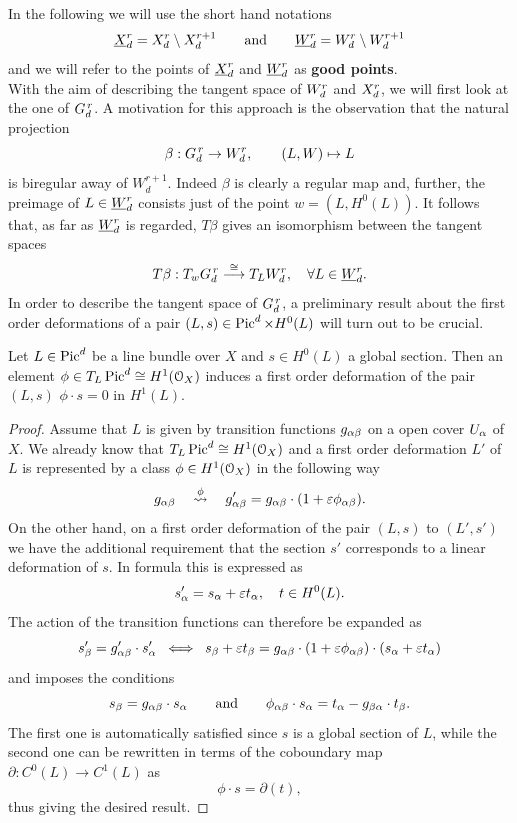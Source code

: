 	In the following we will use the short hand notations
	$$ \underline{X}_d^{r} = X_d^r\setminus X_d^{r+1} \qquad \text{and} \qquad \underline{W}_d^{r} = W_d^r\setminus W_d^{r+1} $$
	and we will refer to the points of $\underline{X}_d^{r}$ and $\underline{W}_d^{r}$ as \textbf{good points}.\\
	With the aim of describing the tangent space of $W_d^r$ and $X_d^r$, we will first look at the one of $G_d^{\,r}$. A motivation for this approach is the observation that the natural projection
	$$ \beta:G_d^{\,r}\to W_d^r, \qquad (L,W) \mapsto L $$
	is biregular away of $W_d^{r+1}$. Indeed $\beta$ is clearly a regular map and, further, the preimage of $L\in \underline{W}_d^{r}$ consists just of the point $w=(L,H^0(L))$. It follows that, as far as $\underline{W}_d^{r}$ is regarded, $T\beta$ gives an isomorphism between the tangent spaces
	\begin{equation}\label{eq:tgnt_Wdrr}
		T\beta : T_{w}G_d^{\,r} \overset{\cong}\longrightarrow T_LW_d^r, \quad \forall L\in\underline{W}_d^{r}.
	\end{equation}
	In order to describe the tangent space of $G_d^{\,r}$, a preliminary result about the first order deformations of a pair $(L,s) \in \operatorname{Pic}^d \times H^0(L)$ will turn out to be crucial.
	\begin{prop}\label{prop:cohom_condition}
		Let $L\in \operatorname{Pic}^d$ be a line bundle over $X$ and $s\in H^0(L)$ a global section. Then an element $\phi \in T_L\operatorname{Pic}^d \cong H^1(\mathcal{O}_X)$ induces a first order deformation of the pair $(L,s)$ \ABiff $\phi\cdot s=0$ in $H^1(L)$.
	\end{prop}
	\begin{proof}
		Assume that $L$ is given by transition functions $g_{\alpha\beta}$ on a open cover $U_\alpha$ of $X$. We already know that $T_L \operatorname{Pic}^d \cong H^1(\mathcal{O}_X)$ and a first order deformation $L'$ of $L$ is represented by a class $\phi \in H^1(\mathcal{O}_X)$ in the following way
		$$ g_{\alpha\beta} \quad\overset{\phi}\leadsto\quad g'_{\alpha\beta} = g_{\alpha\beta} \cdot (1+ \varepsilon \phi_{\alpha\beta}). $$  
		On the other hand, on a first order deformation of the pair $(L,s)$ to $(L',s')$ we have the additional requirement that the section $s'$ corresponds to a linear deformation of $s$. In formula this is expressed as
		$$ s'_\alpha = s_\alpha + \varepsilon t_\alpha, \quad t \in H^0(L). $$
		The action of the transition functions can therefore be expanded as
		$$ s'_\beta = g'_{\alpha\beta} \cdot s'_\alpha \;\iff\; s_\beta + \varepsilon t_\beta = g_{\alpha\beta} \cdot (1 + \varepsilon \phi_{\alpha\beta})\cdot(s_\alpha + \varepsilon t_\alpha)$$
		and imposes the conditions
		$$ s_\beta = g_{\alpha\beta} \cdot s_\alpha \qquad \text{and} \qquad \phi_{\alpha\beta} \cdot s_\alpha = t_\alpha - g_{\beta\alpha}\cdot t_\beta. $$
		The first one is automatically satisfied since $s$ is a global section of $L$, while the second one can be rewritten in terms of the coboundary map $\partial : C^0(L) \to C^1(L)$ as
		$$ \phi \cdot s = \partial (t), $$
		thus giving the desired result.
	\end{proof}
